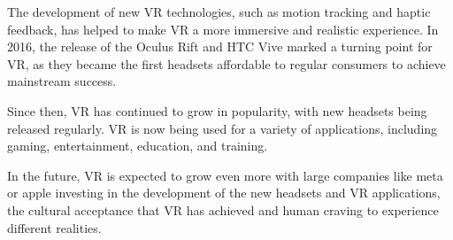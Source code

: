 The development of new VR technologies, such as motion tracking and haptic feedback, has helped to make VR a more immersive and realistic experience. In 2016, the release of the Oculus Rift and HTC Vive marked a turning point for VR, as they became the first headsets affordable to regular consumers to achieve mainstream success.

Since then, VR has continued to grow in popularity, with new headsets being released regularly. VR is now being used for a variety of applications, including gaming, entertainment, education, and training.

In the future, VR is expected to grow even more with large companies like meta or apple investing in the development of the new headsets and VR applications, the cultural acceptance that VR has achieved and human craving to experience different realities.